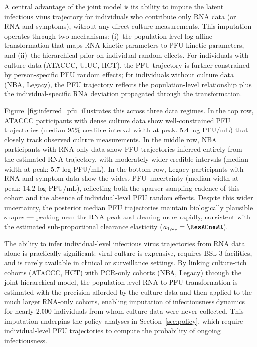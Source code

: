 \documentclass[12pt]{article}
\begin{document}
A central advantage of the joint model is its ability to impute the latent infectious virus trajectory for individuals who contribute only RNA data (or RNA and symptoms), without any direct culture measurements. This imputation operates through two mechanisms: (i)~the population-level log-affine transformation that maps RNA kinetic parameters to PFU kinetic parameters, and (ii)~the hierarchical prior on individual random effects. For individuals with culture data (ATACCC, UIUC, HCT), the PFU trajectory is further constrained by person-specific PFU random effects; for individuals without culture data (NBA, Legacy), the PFU trajectory reflects the population-level relationship plus the individual-specific RNA deviation propagated through the transformation.

Figure~\ref{fig:inferred_pfu} illustrates this across three data regimes. In the top row, ATACCC participants with dense culture data show well-constrained PFU trajectories (median 95\% credible interval width at peak: 5.4 log PFU/mL) that closely track observed culture measurements. In the middle row, NBA participants with RNA-only data show PFU trajectories inferred entirely from the estimated RNA trajectory, with moderately wider credible intervals (median width at peak: 5.7 log PFU/mL). In the bottom row, Legacy participants with RNA and symptom data show the widest PFU uncertainty (median width at peak: 14.2 log PFU/mL), reflecting both the sparser sampling cadence of this cohort and the absence of individual-level PFU random effects. Despite this wider uncertainty, the posterior median PFU trajectories maintain biologically plausible shapes --- peaking near the RNA peak and clearing more rapidly, consistent with the estimated sub-proportional clearance elasticity ($a_{1,\omega_r} = \ResAOneWR$).

The ability to infer individual-level infectious virus trajectories from RNA data alone is practically significant: viral culture is expensive, requires BSL-3 facilities, and is rarely available in clinical or surveillance settings. By linking culture-rich cohorts (ATACCC, HCT) with PCR-only cohorts (NBA, Legacy) through the joint hierarchical model, the population-level RNA-to-PFU transformation is estimated with the precision afforded by the culture data and then applied to the much larger RNA-only cohorts, enabling imputation of infectiousness dynamics for nearly 2{,}000 individuals from whom culture data were never collected. This imputation underpins the policy analyses in Section~\ref{sec:policy}, which require individual-level PFU trajectories to compute the probability of ongoing infectiousness.
\end{document}
